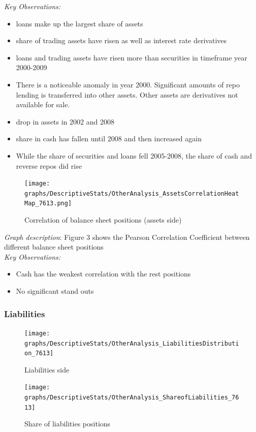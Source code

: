 \documentclass[12pt, a4paper]{article} %
\begin{document}
\noindent \textit{Key Observations:}
\begin{itemize}
\item loans make up the largest share of assets
\item share of trading assets have risen as well as interest rate derivatives
\item loans and trading assets have risen more than securities in timeframe year 2000-2009
\item There is a noticeable anomaly in year 2000. Significant amounts of repo lending is transferred into other assets. Other assets are derivatives not available for sale. 
\item drop in assets in 2002 and 2008
\item share in cash has fallen until 2008 and then increased again
\item While the share of securities and loans fell 2005-2008, the share of cash and reverse repos did rise
\end{itemize}

\begin{figure}[hbtp]
\centering
\caption{Correlation of balance sheet positions (assets side)}
\texttt{[image: graphs/DescriptiveStats/OtherAnalysis\_AssetsCorrelationHeatMap\_7613.png]}
\end{figure}

\noindent \textit{Graph description}: Figure 3 shows the Pearson Correlation Coefficient between different balance sheet positions\\

\textit{Key Observations:}
\begin{itemize}
\item Cash has the weakest correlation with the rest positions
\item No significant stand outs
\end{itemize}

\subsubsection{Liabilities}

\begin{figure}[hbtp]
\centering
\caption{Liabilities side}
\texttt{[image: graphs/DescriptiveStats/OtherAnalysis\_LiabilitiesDistribution\_7613]}
\end{figure}


\begin{figure}[hbtp]
\centering
\caption{Share of liabilities positions}
\texttt{[image: graphs/DescriptiveStats/OtherAnalysis\_ShareofLiabilities\_7613]}
\end{figure}
\end{document}
